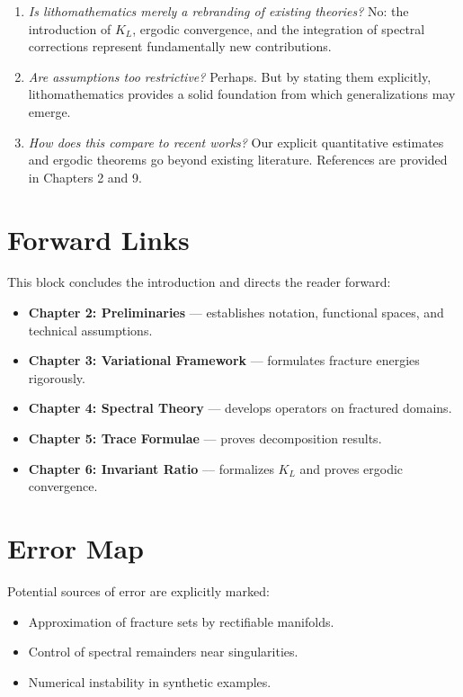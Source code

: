 \begin{enumerate}[label=Q\arabic*., leftmargin=*]
\item \emph{Is lithomathematics merely a rebranding of existing theories?}  
No: the introduction of $K_L$, ergodic convergence, and the integration of spectral corrections represent fundamentally new contributions.
\item \emph{Are assumptions too restrictive?}  
Perhaps. But by stating them explicitly, lithomathematics provides a solid foundation from which generalizations may emerge.
\item \emph{How does this compare to recent works?}  
Our explicit quantitative estimates and ergodic theorems go beyond existing literature. References are provided in Chapters 2 and 9.
\end{enumerate}

\section*{Forward Links}
This block concludes the introduction and directs the reader forward:

\begin{itemize}
\item \textbf{Chapter 2: Preliminaries} — establishes notation, functional spaces, and technical assumptions.
\item \textbf{Chapter 3: Variational Framework} — formulates fracture energies rigorously.
\item \textbf{Chapter 4: Spectral Theory} — develops operators on fractured domains.
\item \textbf{Chapter 5: Trace Formulae} — proves decomposition results.
\item \textbf{Chapter 6: Invariant Ratio} — formalizes $K_L$ and proves ergodic convergence.
\end{itemize}

\section*{Error Map}
Potential sources of error are explicitly marked:
\begin{itemize}
\item Approximation of fracture sets by rectifiable manifolds.
\item Control of spectral remainders near singularities.
\item Numerical instability in synthetic examples.
\end{itemize}

